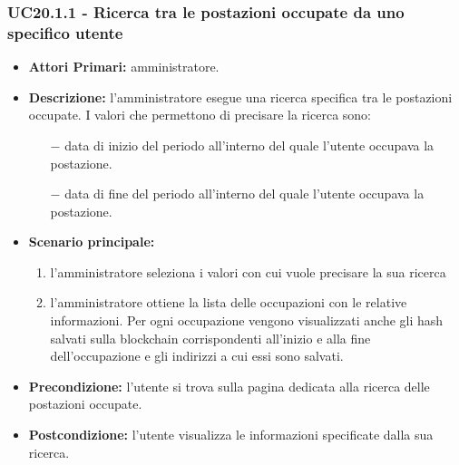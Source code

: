 \subsubsection{ UC20.1.1 - Ricerca tra le postazioni occupate da uno specifico utente}
\begin{itemize}
	\item\textbf{Attori Primari:} 
	amministratore.
	\item\textbf{Descrizione:} 
	l'amministratore esegue una ricerca specifica tra le postazioni occupate.
	I valori che permettono di precisare la ricerca sono:
	\begin{itemize}
		\item[$-$] data di inizio del periodo all'interno del quale l'utente occupava la postazione.
		\item[$-$] data di fine del periodo all'interno del quale l'utente occupava la postazione.
	\end{itemize}
	\item\textbf{Scenario principale:} 
	\begin{enumerate}
		\item l'amministratore seleziona i valori con cui vuole precisare la sua ricerca
		\item l'amministratore ottiene la lista delle occupazioni con le relative informazioni. Per ogni occupazione vengono visualizzati anche gli hash salvati sulla blockchain corrispondenti all'inizio e alla fine dell'occupazione e gli indirizzi a cui essi sono salvati.
	\end{enumerate}
	\item\textbf{Precondizione:} 
	l'utente si trova sulla pagina dedicata alla ricerca delle postazioni occupate.
	\item\textbf{Postcondizione:}
	l'utente visualizza le informazioni specificate dalla sua ricerca.
\end{itemize}

